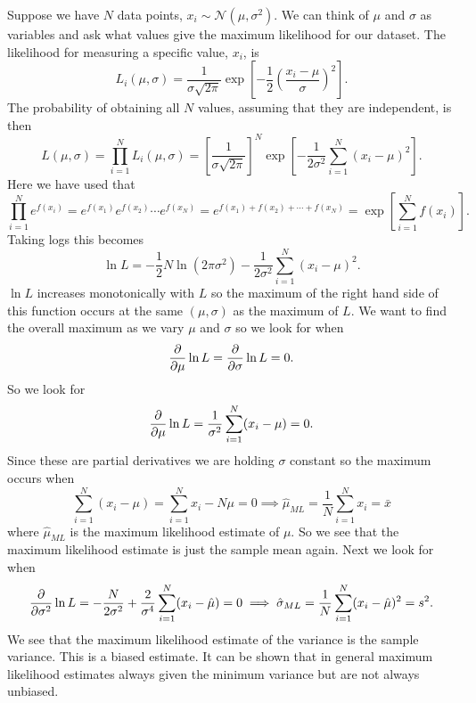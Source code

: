 \documentclass[a4paper]{article}
\newcommand{\distributed}{\sim}
\newcommand{\normal}{\mathcal{N}}
\begin{document}
    Suppose we have \(N\) data points, \(x_i\distributed\normal(\mu, \sigma^2)\).
    We can think of \(\mu\) and \(\sigma\) as variables and ask what values give the maximum likelihood for our dataset.
    The likelihood for measuring a specific value, \(x_i\), is
    \[L_i(\mu, \sigma) = \frac{1}{\sigma\sqrt{2\pi}}\exp\left[-\frac{1}{2}\left(\frac{x_i - \mu}{\sigma}\right)^2\right].\]
    The probability of obtaining all \(N\) values, assuming that they are independent, is then
    \[L(\mu, \sigma) = \prod_{i=1}^{N}L_i(\mu, \sigma) = \left[\frac{1}{\sigma\sqrt{2\pi}}\right]^N \exp\left[-\frac{1}{2\sigma^2}\sum_{i=1}^{N}(x_i - \mu)^2\right].\]
    Here we have used that 
    \[\prod_{i=1}^N e^{f(x_i)} = e^{f(x_1)}e^{f(x_2)}\dotsm e^{f(x_N)} = e^{f(x_1) + f(x_2) + \dotsb + f(x_N)} = \exp\left[\sum_{i=1}^{N} f(x_i)\right].\]
    Taking logs this becomes
    \begin{equation}\label{eqn:log likelihood}
        \ln L = -\frac{1}{2} N\ln(2\pi\sigma^2) - \frac{1}{2\sigma^2}\sum_{i=1}^{N} (x_i - \mu)^2.
    \end{equation}
    \(\ln L\) increases monotonically with \(L\) so the maximum of the right hand side of this function occurs at the same \((\mu, \sigma)\) as the maximum of \(L\).
    We want to find the overall maximum as we vary \(\mu\) and \(\sigma\) so we look for when
    \[\pdv{\mu} \ln L = \pdv{\sigma}\ln L = 0.\]
    So we look for
    \[\pdv{\mu}\ln L = \frac{1}{\sigma^2}\sum_{i=1}^N(x_i - \mu) = 0.\]
    Since these are partial derivatives we are holding \(\sigma\) constant so the maximum occurs when
    \[\sum_{i=1}^{N} (x_i - \mu) = \sum_{i=1}^{N}x_i - N\mu = 0 \implies \hat{\mu}_{ML} = \frac{1}{N}\sum_{i=1}^{N} x_i = \bar{x}\]
    where \(\hat{\mu}_{ML}\) is the maximum likelihood estimate of \(\mu\).
    So we see that the maximum likelihood estimate is just the sample mean again.
    Next we look for when
    \[\pdv{\sigma^2}\ln L = -\frac{N}{2\sigma^2} + \frac{2}{\sigma^4}\sum_{i=1}^{N}(x_i - \hat{\mu}) = 0 \implies \hat{\sigma}_{ML} = \frac{1}{N}\sum_{i=1}^{N}(x_i - \hat{\mu})^2 = s^2.\]
    We see that the maximum likelihood estimate of the variance is the sample variance.
    This is a biased estimate.
    It can be shown that in general maximum likelihood estimates always given the minimum variance but are not always unbiased.
    
\end{document}
